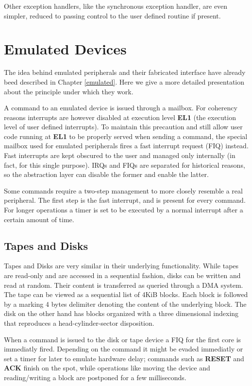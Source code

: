 \documentclass[12pt,a4paper,openright,twoside]{report}
\begin{document}
Other exception handlers, like the synchronous exception handler, are even 
simpler, reduced to passing control to the user defined routine if present.


\section{Emulated Devices}
\label{emulateddev}
The idea behind emulated peripherals and their fabricated interface 
have already beed described in Chapter \ref{emulated}. Here we give a more detailed 
presentation about the principle under which they work.

A command to an emulated device is issued through a mailbox. For coherency reasons
interrupts are however disabled at execution level \textbf{EL1} (the execution
level of user defined interrupts). To maintain this precaution and still allow 
user code running at \textbf{EL1} to be properly served when sending a command, the
special mailbox used for emulated peripherals fires a fast interrupt request (FIQ)
instead.
Fast interrupts are kept obscured to the user and managed only internally (in fact,
for this single purpose). IRQs and FIQs are separated for historical reasons, so 
the abstraction layer can disable the former and enable the latter.

Some commands require a two-step management to more closely resemble a real peripheral.
The first step is the fast interrupt, and is present for every command. For longer
operations a timer is set to be executed by a normal interrupt after a certain amount
of time.

\subsection{Tapes and Disks}
Tapes and Disks are very similar in their underlying functionality. While tapes 
are read-only and are accessed in a sequential fashion, disks can be written and
read at random. Their content is transferred as queried through a DMA system.
The tape can be viewed as a sequential list of 4KiB blocks. Each block is followed
by a marking 4 bytes delimiter denoting the content of the underlying block.
The disk on the other hand has blocks organized with a three dimensional indexing
that reproduces a head-cylinder-sector disposition.

When a command is issued to the disk or tape device a FIQ for the first core is immediatly
fired. Depending on the command it might be evaded immediatly or set a timer for
later to emulate hardware delay; commands such as \textbf{RESET} and \textbf{ACK}
finish on the spot, while operations like moving the device and reading/writing
 a block are postponed for a few milliseconds.\\
\end{document}
